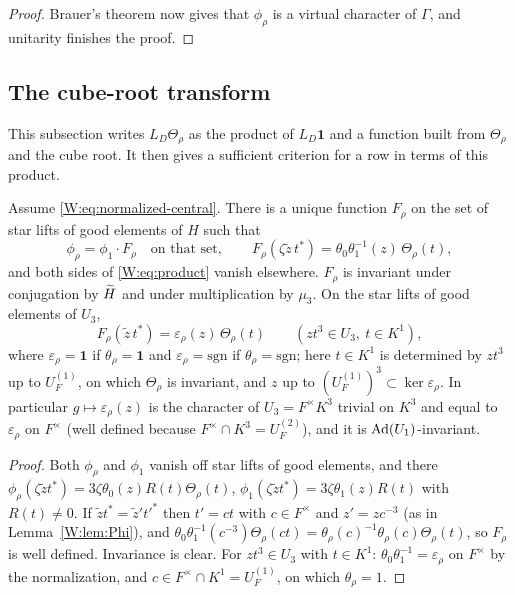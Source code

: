 \begin{proof}
Brauer's theorem now gives that $\phi_\rho$ is a virtual character of
$\Gamma$, and unitarity finishes the proof.
\end{proof}

\subsection{The cube-root transform}
This subsection writes $L_D\Theta_\rho$ as the product of $L_D\mathbf1$ and a function built from $\Theta_\rho$ and the cube root. It then gives a sufficient criterion for a row in terms of this product.

\begin{lemma}\label{W:lem:product}
Assume \eqref{W:eq:normalized-central}.  There is a unique function
$F_\rho$ on the set of star lifts of good elements of $H$ such that
\begin{equation}\label{W:eq:product}
 \phi_\rho=\phi_1\cdot F_\rho\quad\text{on that set},\qquad
 F_\rho(\zeta\tilde z\,t^*)=\theta_0\theta_1^{-1}(z)\,\Theta_\rho(t),
\end{equation}
and both sides of \eqref{W:eq:product} vanish elsewhere.  $F_\rho$ is
invariant under conjugation by $\widetilde H$ and under multiplication by
$\mu_3$.  On the star lifts of good elements of $U_3$,
\begin{equation}\label{W:eq:Frho-U3}
 F_\rho(\tilde z\,t^*)=\varepsilon_\rho(z)\,\Theta_\rho(t)\qquad(zt^3\in U_3,\ t\in K^1),
\end{equation}
where $\varepsilon_\rho=\mathbf1$ if $\theta_\rho=\mathbf1$ and
$\varepsilon_\rho=\mathrm{sgn}$ if $\theta_\rho=\mathrm{sgn}$; here
$t\in K^1$ is determined by $zt^3$ up to $U_F^{(1)}$, on which
$\Theta_\rho$ is invariant, and $z$ up to $(U_F^{(1)})^3\subset\ker\varepsilon_\rho$.
In particular $g\mapsto\varepsilon_\rho(z)$ is the character of $U_3=F^\times K^3$
trivial on $K^3$ and equal to $\varepsilon_\rho$ on $F^\times$ (well
defined because $F^\times\cap K^3=U_F^{(2)}$), and it is $\operatorname{Ad}(U_1)$-invariant.
\end{lemma}
\begin{proof}
Both $\phi_\rho$ and $\phi_1$ vanish off star lifts of good elements, and
there $\phi_\rho(\zeta\tilde zt^*)=3\zeta\theta_0(z)R(t)\Theta_\rho(t)$,
$\phi_1(\zeta\tilde zt^*)=3\zeta\theta_1(z)R(t)$ with $R(t)\ne0$.  If
$\tilde zt^*=\tilde z't'^*$ then $t'=ct$ with $c\in F^\times$ and
$z'=zc^{-3}$ (as in Lemma~\ref{W:lem:Phi}), and
$\theta_0\theta_1^{-1}(c^{-3})\Theta_\rho(ct)=\theta_\rho(c)^{-1}\theta_\rho(c)\Theta_\rho(t)$,
so $F_\rho$ is well defined.  Invariance is clear.  For $zt^3\in U_3$
with $t\in K^1$: $\theta_0\theta_1^{-1}=\varepsilon_\rho$ on $F^\times$
by the normalization, and $c\in F^\times\cap K^1=U_F^{(1)}$, on which
$\theta_\rho=1$.
\end{proof}

